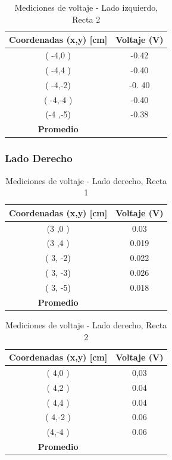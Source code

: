 \documentclass[11pt,twocolumn]{article}
\begin{document}
\begin{table}[h]
\centering
\caption{Mediciones de voltaje - Lado izquierdo, Recta 2}
\begin{tabular}{cc}
\toprule
\textbf{Coordenadas (x,y) [cm]} & \textbf{Voltaje (V)} \\
\midrule
( -4,0 ) & -0.42 \\
( -4,4 ) & -0.40 \\
( -4,-2) & -0. 40 \\
( -4,-4 ) & -0.40 \\
(-4 ,-5) &  -0.38\\
\midrule
\textbf{Promedio} &  \\
\bottomrule
\end{tabular}
\end{table}

\subsubsection*{Lado Derecho}

\begin{table}[h]
\centering
\caption{Mediciones de voltaje - Lado derecho, Recta 1}
\begin{tabular}{cc}
\toprule
\textbf{Coordenadas (x,y) [cm]} & \textbf{Voltaje (V)} \\
\midrule
(3 ,0 ) &  0.03\\
(3 ,4 ) &  0.019\\
( 3, -2) &  0.022\\
( 3, -3) &  0.026\\
( 3, -5) & 0.018 \\
\midrule
\textbf{Promedio} &  \\
\bottomrule
\end{tabular}
\end{table}

\begin{table}[h]
\centering
\caption{Mediciones de voltaje - Lado derecho, Recta 2}
\begin{tabular}{cc}
\toprule
\textbf{Coordenadas (x,y) [cm]} & \textbf{Voltaje (V)} \\
\midrule
( 4,0 ) & 0,03 \\
( 4,2 ) & 0.04 \\
( 4,4 ) & 0.04 \\
( 4,-2 ) & 0.06 \\
(4,-4 ) & 0.06 \\
\midrule
\textbf{Promedio} &  \\
\bottomrule
\end{tabular}
\end{table}
\end{document}
